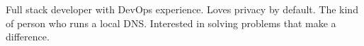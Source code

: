 
\begin{cvparagraph}
Full stack developer with DevOps experience. Loves privacy by default. The kind of person who runs a local DNS. Interested in solving problems that make a difference.
\end{cvparagraph}
